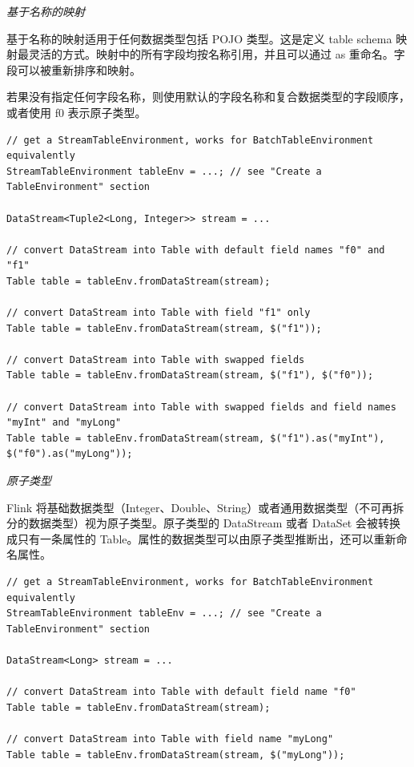 \documentclass[cn,11pt,chinese]{elegantbook}
\begin{document}
\textit{基于名称的映射}

基于名称的映射适用于任何数据类型包括 POJO 类型。这是定义 table schema 映射最灵活的方式。映射中的所有字段均按名称引用，并且可以通过 as 重命名。字段可以被重新排序和映射。

若果没有指定任何字段名称，则使用默认的字段名称和复合数据类型的字段顺序，或者使用 f0 表示原子类型。

\begin{verbatim}
// get a StreamTableEnvironment, works for BatchTableEnvironment equivalently
StreamTableEnvironment tableEnv = ...; // see "Create a TableEnvironment" section

DataStream<Tuple2<Long, Integer>> stream = ...

// convert DataStream into Table with default field names "f0" and "f1"
Table table = tableEnv.fromDataStream(stream);

// convert DataStream into Table with field "f1" only
Table table = tableEnv.fromDataStream(stream, $("f1"));

// convert DataStream into Table with swapped fields
Table table = tableEnv.fromDataStream(stream, $("f1"), $("f0"));

// convert DataStream into Table with swapped fields and field names "myInt" and "myLong"
Table table = tableEnv.fromDataStream(stream, $("f1").as("myInt"), $("f0").as("myLong"));
\end{verbatim}

\textit{原子类型}

Flink 将基础数据类型（Integer、Double、String）或者通用数据类型（不可再拆分的数据类型）视为原子类型。原子类型的 DataStream 或者 DataSet 会被转换成只有一条属性的 Table。属性的数据类型可以由原子类型推断出，还可以重新命名属性。

\begin{verbatim}
// get a StreamTableEnvironment, works for BatchTableEnvironment equivalently
StreamTableEnvironment tableEnv = ...; // see "Create a TableEnvironment" section

DataStream<Long> stream = ...

// convert DataStream into Table with default field name "f0"
Table table = tableEnv.fromDataStream(stream);

// convert DataStream into Table with field name "myLong"
Table table = tableEnv.fromDataStream(stream, $("myLong"));
\end{verbatim}
\end{document}
